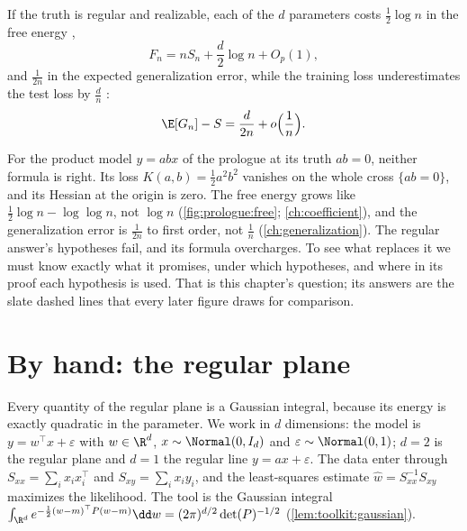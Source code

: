 \begin{refsection}
\begin{regularanswer}
If the truth is regular and realizable, each of the $d$ parameters costs $\tfrac12\log n$ in the free energy \parencite{Schwarz1978},
\[
F_n=nS_n+\frac d2\log n+O_p(1),
\]
and $\frac1{2n}$ in the expected generalization error, while the training loss underestimates the test loss by $\frac dn$ \parencite{Akaike1974}:
\[
\E[G_n]-S=\frac d{2n}+o\Bigl(\frac1n\Bigr).
\]
\end{regularanswer}

For the product model $y=abx$ of the prologue at its truth $ab=0$, neither formula is right. Its loss $K(a,b)=\tfrac12a^2b^2$ vanishes on the whole cross $\{ab=0\}$, and its Hessian at the origin is zero. The free energy grows like $\tfrac12\log n-\log\log n$, not $\log n$ (\cref{fig:prologue:free}; \cref{ch:coefficient}), and the generalization error is $\frac1{2n}$ to first order, not $\frac1n$ (\cref{ch:generalization}). The regular answer's hypotheses fail, and its formula overcharges. To see what replaces it we must know exactly what it promises, under which hypotheses, and where in its proof each hypothesis is used. That is this chapter's question; its answers are the slate dashed lines that every later figure draws for comparison.

\section{By hand: the regular plane}\label{sec:regular:byhand}

Every quantity of the regular plane is a Gaussian integral, because its energy is exactly quadratic in the parameter. We work in $d$ dimensions: the model is $y=w^\top x+\varepsilon$ with $w\in\R^d$, $x\sim\Normal(0,I_d)$ and $\varepsilon\sim\Normal(0,1)$; $d=2$ is the regular plane and $d=1$ the regular line $y=ax+\varepsilon$. The data enter through $S_{xx}=\sum_ix_ix_i^\top$ and $S_{xy}=\sum_ix_iy_i$, and the least-squares estimate $\hat w=S_{xx}^{-1}S_{xy}$ maximizes the likelihood. The tool is the Gaussian integral $\int_{\R^d}e^{-\frac12(w-m)^\top P(w-m)}\dd w=(2\pi)^{d/2}\det(P)^{-1/2}$ (\cref{lem:toolkit:gaussian}).


\end{refsection}
